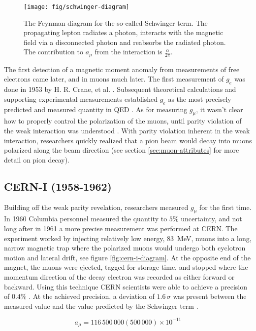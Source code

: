 \begin{figure}
\centering
\texttt{[image: fig/schwinger-diagram]}
\caption{The Feynman diagram for the so-called Schwinger term. The propagating lepton radiates a photon, interacts with the magnetic field via a disconnected photon and reabsorbs the radiated photon.  The contribution to $a_\mu$ from the interaction is $\frac{\alpha}{2\pi}$. \label{fig:schwinger-diagram}}
\end{figure}

The first detection of a magnetic moment anomaly from measurements of free electrons came later, and in muons much later.  The first measurement of $g_e$ was done in 1953 by H. R. Crane, et al. \cite{g-e-crane}.  Subsequent theoretical calculations and supporting experimental measurements established $g_e$ as the most precisely predicted and measured quantity in QED \cite{g-e-measurement}.  As for measuring $g_\mu$, it wasn't clear how to properly control the polarization of the muons, until parity violation of the weak interaction was understood \cite{lee-yang, wu-expt}.  With parity violation inherent in the weak interaction, researchers quickly realized that a pion beam would decay into muons polarized along the beam direction (see section \ref{sec:muon-attributes} for more detail on pion decay).

\subsection{CERN-I (1958-1962)}
Building off the weak parity revelation, researchers measured $g_\mu$ for the first time.  In 1960 Columbia personnel measured the quantity to $5\%$ uncertainty, and not long after in 1961 a more precise measurement was performed at CERN.  The experiment worked by injecting relatively low energy, \SI{83}{\MeV}, muons into a long, narrow magnetic trap where the polarized muons would undergo both cyclotron motion and lateral drift, see figure \ref{fig:cern-i-diagram}. At the opposite end of the magnet, the muons were ejected, tagged for storage time, and stopped where the momentum direction of the decay electron was recorded as either forward or backward.  Using this technique CERN scientists were able to achieve a precision of $0.4\%$ \cite{cern-i}.  At the achieved precision, a deviation of $1.6\,\sigma$ was present between the measured value and the value predicted by the Schwinger term \cite{47y-muon-g-2}.

\begin{equation}
\label{eqn:cern-i-results}
a_\mu = 116\,500\,000 (500\,000) \times 10^{-11}
\end{equation}

